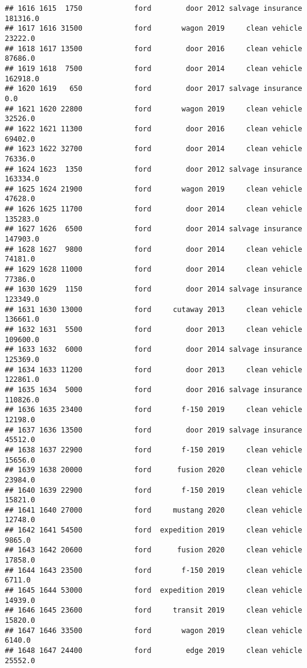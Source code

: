 \documentclass[
]{article}
\begin{document}
\begin{verbatim}
## 1616 1615  1750            ford        door 2012 salvage insurance  181316.0
## 1617 1616 31500            ford       wagon 2019     clean vehicle   23222.0
## 1618 1617 13500            ford        door 2016     clean vehicle   87686.0
## 1619 1618  7500            ford        door 2014     clean vehicle  162918.0
## 1620 1619   650            ford        door 2017 salvage insurance       0.0
## 1621 1620 22800            ford       wagon 2019     clean vehicle   32526.0
## 1622 1621 11300            ford        door 2016     clean vehicle   69402.0
## 1623 1622 32700            ford        door 2014     clean vehicle   76336.0
## 1624 1623  1350            ford        door 2012 salvage insurance  163334.0
## 1625 1624 21900            ford       wagon 2019     clean vehicle   47628.0
## 1626 1625 11700            ford        door 2014     clean vehicle  135283.0
## 1627 1626  6500            ford        door 2014 salvage insurance  147903.0
## 1628 1627  9800            ford        door 2014     clean vehicle   74181.0
## 1629 1628 11000            ford        door 2014     clean vehicle   77386.0
## 1630 1629  1150            ford        door 2014 salvage insurance  123349.0
## 1631 1630 13000            ford     cutaway 2013     clean vehicle  136661.0
## 1632 1631  5500            ford        door 2013     clean vehicle  109600.0
## 1633 1632  6000            ford        door 2014 salvage insurance  125369.0
## 1634 1633 11200            ford        door 2013     clean vehicle  122861.0
## 1635 1634  5000            ford        door 2016 salvage insurance  110826.0
## 1636 1635 23400            ford       f-150 2019     clean vehicle   12198.0
## 1637 1636 13500            ford        door 2019 salvage insurance   45512.0
## 1638 1637 22900            ford       f-150 2019     clean vehicle   15656.0
## 1639 1638 20000            ford      fusion 2020     clean vehicle   23984.0
## 1640 1639 22900            ford       f-150 2019     clean vehicle   15821.0
## 1641 1640 27000            ford     mustang 2020     clean vehicle   12748.0
## 1642 1641 54500            ford  expedition 2019     clean vehicle    9865.0
## 1643 1642 20600            ford      fusion 2020     clean vehicle   17858.0
## 1644 1643 23500            ford       f-150 2019     clean vehicle    6711.0
## 1645 1644 53000            ford  expedition 2019     clean vehicle   14939.0
## 1646 1645 23600            ford     transit 2019     clean vehicle   15820.0
## 1647 1646 33500            ford       wagon 2019     clean vehicle    6140.0
## 1648 1647 24400            ford        edge 2019     clean vehicle   25552.0

\end{verbatim}
\end{document}
